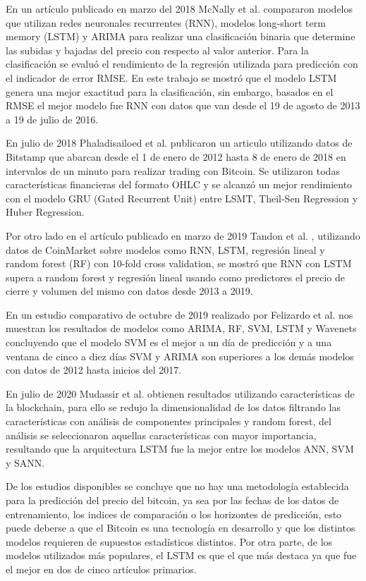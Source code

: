 En un artículo publicado en marzo del 2018 McNally et al. \cite{mcnallyPredictingPriceBitcoin2018} compararon modelos que utilizan redes neuronales recurrentes (RNN), modelos long-short term memory (LSTM) y ARIMA para realizar una clasificación binaria que determine las subidas y bajadas del precio con respecto al valor anterior. Para la clasificación se evaluó el rendimiento de la regresión utilizada para predicción con el indicador de error RMSE.
En este trabajo se mostró que el modelo LSTM genera una mejor exactitud para la clasificación, sin embargo, basados en el RMSE el mejor modelo fue RNN con datos que van desde el 19 de agosto de 2013 a 19 de julio de 2016. 

En julio de 2018 Phaladisailoed et al. \cite{phaladisailoedMachineLearningModels2018} publicaron un articulo utilizando datos de Bitstamp que abarcan desde el 1 de enero de 2012 hasta 8 de enero de 2018 en intervalos de un minuto para realizar trading con Bitcoin. Se utilizaron todas características financieras del formato OHLC y se alcanzó un mejor rendimiento con el modelo GRU (Gated Recurrent Unit) entre LSMT, Theil-Sen Regression y Huber Regression. 


Por otro lado en el artículo publicado en marzo de 2019 Tandon et al. \cite{tandonBitcoinPriceForecasting2019}, utilizando datos de CoinMarket sobre modelos como RNN, LSTM, regresión lineal y random forest (RF) con 10-fold cross validation, se mostró que RNN con LSTM supera a random forest y regresión lineal usando como predictores el precio de cierre y volumen del mismo con datos desde 2013 a 2019.

En un estudio comparativo de octubre de 2019 realizado por Felizardo et al. \cite{felizardoComparativeStudyBitcoin2019} nos muestran los resultados de modelos como ARIMA, RF, SVM, LSTM y Wavenets concluyendo que el modelo SVM es el mejor a un día de predicción y a una ventana de cinco a diez días SVM y ARIMA son superiores a los demás modelos con datos de 2012 hasta inicios del 2017.


En julio de 2020 Mudassir et al. \cite{mudassirTimeseriesForecastingBitcoin2020} obtienen resultados utilizando características de la blockchain, para ello se redujo la dimensionalidad de los datos filtrando las características con análisis de componentes principales y random forest, del análisis se seleccionaron aquellas características con mayor importancia, resultando que la arquitectura LSTM fue la mejor entre los modelos ANN, SVM y SANN.

De los estudios disponibles se concluye que no hay una metodología establecida para la predicción del precio del bitcoin, ya sea por las fechas de los datos de entrenamiento, los indices de comparación o los horizontes de predicción, esto puede deberse a que el Bitcoin es una tecnología en desarrollo y que los distintos modelos requieren de supuestos estadísticos distintos. 
Por otra parte, de los modelos utilizados más populares, el LSTM es que el que más destaca ya que fue el mejor en dos de cinco artículos primarios.



